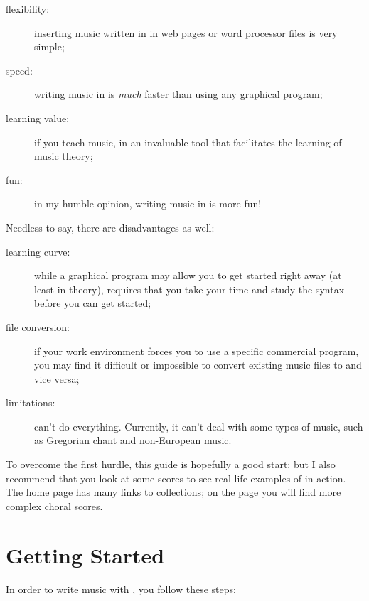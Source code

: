 \documentclass[a4paper,12pt]{book}
\begin{document}
\begin{description}
  \item [flexibility:] inserting music written in \ABC{} in web pages
  or word processor files is very simple;
  
  \item [speed:] writing music in \ABC{} is \emph{much} faster than
  using any graphical program;
  
  \item [learning value:] if you teach music, \ABC{} in an invaluable
  tool that facilitates the learning of music theory;
  
  \item [fun:] in my humble opinion, writing music in \ABC{} is more
  fun!
  
\end{description}

Needless to say, there are disadvantages as well:

\begin{description}
  
  \item [learning curve:] while a graphical program may allow you to
  get started right away (at least in theory), \ABC{} requires that
  you take your time and study the syntax before you can get started;
  
  \item [file conversion:] if your work environment forces you to use a
  specific commercial program, you may find it difficult or impossible
  to convert existing music files to \ABC{} and vice versa;
  
  \item [limitations:] \ABC{} can't do everything. Currently, it can't
  deal with some types of music, such as Gregorian chant and
  non-European music.
  
\end{description}

To overcome the first hurdle, this guide is hopefully a good start;
but I also recommend that you look at some scores to see real-life
examples of \ABC{} in action. The \ABC{} home page has many links to
\ABC{} collections; on the \ABCPLUS{} page you will find more complex
choral scores.


\section{Getting Started}

In order to write music with \ABC, you follow these steps:
\end{document}
